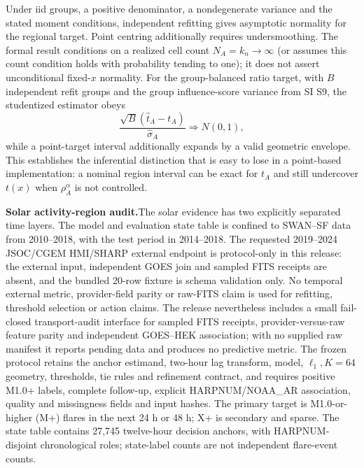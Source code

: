 \documentclass[10pt]{article}
\begin{document}
Under iid groups, a positive denominator, a nondegenerate variance and the stated moment conditions, independent refitting gives asymptotic normality for the regional target. Point centring additionally requires undersmoothing. The formal result conditions on a realized cell count $N_A=k_n\to\infty$ (or assumes this count condition holds with probability tending to one); it does not assert unconditional fixed-$x$ normality. For the group-balanced ratio target, with $B$ independent refit groups and the group influence-score variance from SI S9, the studentized estimator obeys
\[
\frac{\sqrt{B}(\hat t_A-t_A)}{\hat\sigma_A}\Rightarrow N(0,1),
\]
while a point-target interval additionally expands by a valid geometric envelope. This establishes the inferential distinction that is easy to lose in a point-based implementation: a nominal region interval can be exact for $t_A$ and still undercover $t(x)$ when $\rho_A^\alpha$ is not controlled.

\textbf{Solar activity-region audit.}\;The solar evidence has two explicitly separated time layers. The model and evaluation state table is confined to SWAN--SF data from 2010--2018, with the test period in 2014--2018. The requested 2019--2024 JSOC/CGEM HMI/SHARP external endpoint is protocol-only in this release: the external input, independent GOES join and sampled FITS receipts are absent, and the bundled 20-row fixture is schema validation only. No temporal external metric, provider-field parity or raw-FITS claim is used for refitting, threshold selection or action claims. The release nevertheless includes a small fail-closed transport-audit interface for sampled FITS receipts, provider-versus-raw feature parity and independent GOES--HEK association; with no supplied raw manifest it reports pending data and produces no predictive metric. The frozen protocol retains the anchor estimand, two-hour lag transform, model, $\ell_1,K=64$ geometry, thresholds, tie rules and refinement contract, and requires positive M1.0+ labels, complete follow-up, explicit HARPNUM/NOAA\_AR association, quality and missingness fields and input hashes. The primary target is M1.0-or-higher (M+) flares in the next 24 h or 48 h; X+ is secondary and sparse. The state table contains 27,745 twelve-hour decision anchors, with HARPNUM-disjoint chronological roles; state-label counts are not independent flare-event counts.
\end{document}
